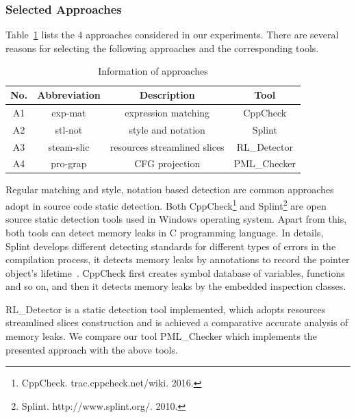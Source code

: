 \subsubsection{Selected Approaches}\label{ssec:ca}
Table~\ref{tab:1} lists the $4$ approaches considered in our experiments. There are several reasons for selecting the following approaches and the corresponding tools. 
%
\begin{table}[!h]
\center
\caption{Information of approaches}\label{tab:1}
\begin{tabular}{|c|c|c|c|}
\hline
\textbf{No.} & \textbf{Abbreviation} & \textbf{Description} & \textbf{Tool}\\
\hline
A1 & exp-mat & expression matching & CppCheck\\
\hline
A2 & stl-not & style and notation &	Splint\\
\hline
A3 & steam-slic & resources streamlined slices & RL\_Detector\\
\hline
A4 & pro-grap &	CFG projection &	PML\_Checker\\
\hline
\end{tabular}
\end{table}
%
Regular matching and style, notation based detection are common approaches adopt in source code static detection. Both CppCheck\footnote{CppCheck. trac.cppcheck.net/wiki. 2016.} and Splint\footnote{Splint. http://www.splint.org/. 2010.} are open source static detection tools used in Windows operating system. Apart from this, both tools can detect memory leaks in C programming language. In details, Splint develops different detecting standards for different types of errors in the compilation process, it detects memory leaks by annotations to record the pointer object’s lifetime~\cite{EL02}. CppCheck first creates symbol database of variables, functions and so on, and then it detects memory leaks by the embedded inspection classes.
 
RL\_Detector is a static detection tool implemented, which adopts resources streamlined slices construction and is achieved a comparative accurate analysis of memory leaks. We compare our tool PML\_Checker which implements the presented approach with the above tools.

